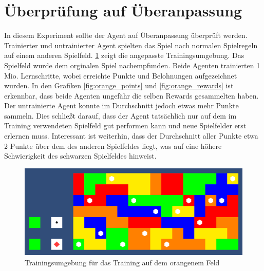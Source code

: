 \newpage
\section{Überprüfung auf Überanpassung}
In diesem Experiment sollte der Agent auf Überanpassung überprüft werden. Trainierter und untrainierter Agent spielten das Spiel nach normalen Spielregeln auf einem anderen Spielfeld.
\ref{fig:OrangeField} zeigt die angepasste Trainingsumgebung. Das Spielfeld wurde dem orginalen Spiel nachempfunden. Beide Agenten trainierten 1 Mio. Lernschritte, wobei erreichte Punkte und Belohnungen aufgezeichnet wurden.
In den Grafiken \ref{fig:orange_points} und \ref{fig:orange_rewards} ist erkennbar, dass beide Agenten ungefähr die selben Rewards gesammelten haben. Der untrainierte Agent konnte im Durchschnitt jedoch etwas mehr Punkte sammeln.
Dies schließt darauf, dass der Agent tatsächlich nur auf dem im Training verwendeten Spielfeld gut performen kann und neue Spielfelder erst erlernen muss.
Interessant ist weiterhin, dass der Durchschnitt aller Punkte etwa 2 Punkte über dem des anderen Spielfeldes liegt, was auf eine höhere Schwierigkeit des schwarzen Spielfeldes hinweist.

\begin{figure}[!h]
    \centering
    \includegraphics[scale=0.2]{Bilder/OrangeField.png}
    \caption{Trainingsumgebung für das Training auf dem orangenem Feld}
    \label{fig:OrangeField}
\end{figure}

